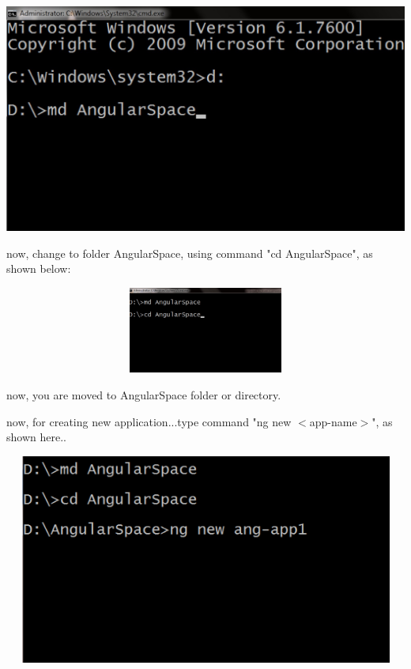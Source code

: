 \documentclass{article}
\begin{document}
\begin{center}
	\noindent \includegraphics*[width=5.26in, height=2.96in]{IMG-01-17}
\end{center}

\noindent  now, change to folder AngularSpace, using command "cd AngularSpace", as shown below:

\begin{center}
	\noindent \includegraphics*[width=5.26in, height=1.12in, trim=0.00in 0.64in 0.00in 0.00in]{IMG-01-18}
\end{center}

\noindent now, you are moved to AngularSpace folder or directory.

\noindent now, for creating new application...type command "ng new $\mathrm{<}$app-name$\mathrm{>}$", as shown here..

\begin{center}
	\noindent \includegraphics*[width=5.41in, height=2.72in]{IMG-01-19}
\end{center}
\end{document}
